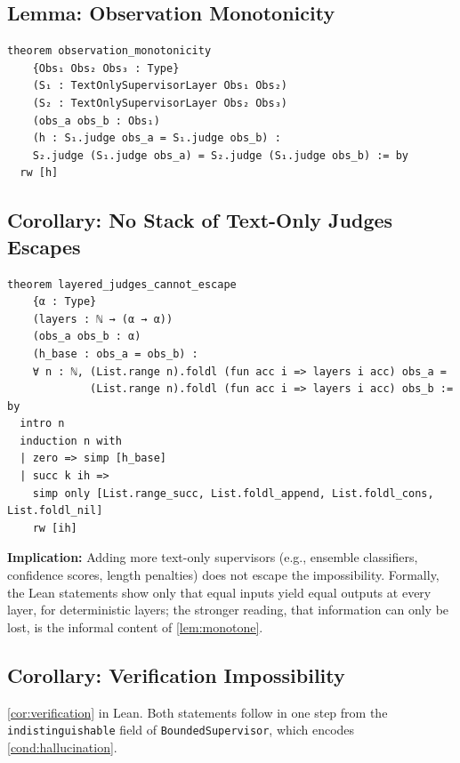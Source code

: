 \documentclass[11pt]{article}
\begin{document}
\subsection{Lemma: Observation Monotonicity}

\begin{lstlisting}[caption=Observation Monotonicity (Lean), label=lst:lean-mono]
theorem observation_monotonicity
    {Obs₁ Obs₂ Obs₃ : Type}
    (S₁ : TextOnlySupervisorLayer Obs₁ Obs₂)
    (S₂ : TextOnlySupervisorLayer Obs₂ Obs₃)
    (obs_a obs_b : Obs₁)
    (h : S₁.judge obs_a = S₁.judge obs_b) :
    S₂.judge (S₁.judge obs_a) = S₂.judge (S₁.judge obs_b) := by
  rw [h]
\end{lstlisting}

\subsection{Corollary: No Stack of Text-Only Judges Escapes}

\begin{lstlisting}[caption=Layered Judges Cannot Escape (Lean), label=lst:lean-layered]
theorem layered_judges_cannot_escape
    {α : Type}
    (layers : ℕ → (α → α))
    (obs_a obs_b : α)
    (h_base : obs_a = obs_b) :
    ∀ n : ℕ, (List.range n).foldl (fun acc i => layers i acc) obs_a =
             (List.range n).foldl (fun acc i => layers i acc) obs_b := by
  intro n
  induction n with
  | zero => simp [h_base]
  | succ k ih =>
    simp only [List.range_succ, List.foldl_append, List.foldl_cons, List.foldl_nil]
    rw [ih]
\end{lstlisting}

\textbf{Implication:} Adding more text-only supervisors (e.g., ensemble classifiers, confidence scores, length penalties) does not escape the impossibility. Formally, the Lean statements show only that equal inputs yield equal outputs at every layer, for deterministic layers; the stronger reading, that information can only be lost, is the informal content of \autoref{lem:monotone}.

\subsection{Corollary: Verification Impossibility}

\autoref{cor:verification} in Lean. Both statements follow in one step from the \texttt{indistinguishable} field of \texttt{BoundedSupervisor}, which encodes \autoref{cond:hallucination}.
\end{document}
